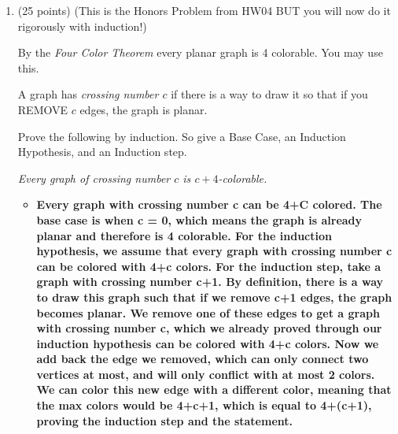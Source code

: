 \documentclass[12pt]{article}
\begin{document}
\begin{enumerate}
$(\forall n\ge 2)[a_n = a_{n-1} + 3a_{n-2}]$

Find INTEGERS $A,B$ such that

$(\forall n\ge 0)[a_n \le AB^n].$

Try to make $B$ as small as possible .

\textbf{This recurrence can be best described by an exponential function like $r^n = r^{n-1} + 3r^{n-2}$. Dividing everything by $r^{n-2}$, we get $r^2 = r + 3$. Therefore, we can find the roots of this equation to get $r = \frac {1 \pm \sqrt{13}} {2}$. The larger root of these will control how the function grows, and the larger root is approximately 2.3, so we can choose B to be the smallest integer larger than this root, which is B = 3. Plugging the b value into the base cases, we see that A is approximately 33.3, so we can choose A to be 34. Then, assuming that $a_{n-1} \le A3^{n-1}$ and $a_{n-2} \le A3^{n-2}$, we can show that $a_n = a_{n-1} + 3a_{n-2} \le A3^{n-1} + 3A3^{n-2} = A3^n$, since $A3^{n-1}$ can be written as a term of $A3^{n-2}$, that side of the equation is equal to $6A3^{n-2}$ which is equal to $2/3A3^{n}$. Since 2/3 is less than 1, the inequality holds}

\vfill

\centerline{\bf GO TO NEXT PAGE}

\newpage


\item 
(25 points) 
(This is the Honors Problem from HW04 BUT you will now do it 
rigorously with induction!)

By the {\it Four Color Theorem} every planar graph is 4 colorable.
You may use this. 

A graph has {\it crossing number $c$} if there is a way
to draw it so that if you REMOVE $c$ edges, the graph is planar.

Prove the following by induction. So give a Base Case, an Induction Hypothesis,
and an Induction step.

{\it Every graph of crossing number $c$ is $c+4$-colorable.} 

\begin{itemize}
    \item \textbf{Every graph with crossing number c can be 4+C colored. The base case is when c = 0, which means the graph is already planar and therefore is 4 colorable. For the induction hypothesis, we assume that every graph with crossing number c can be colored with 4+c colors. For the induction step, take a graph with crossing number c+1. By definition, there is a way to draw this graph such that if we remove c+1 edges, the graph becomes planar. We remove one of these edges to get a graph with crossing number c, which we already proved through our induction hypothesis can be colored with 4+c colors. Now we add back the edge we removed, which can only connect two vertices at most, and will only conflict with at most 2 colors. We can color this new edge with a different color, meaning that the max colors would be 4+c+1, which is equal to 4+(c+1), proving the induction step and the statement.}
\end{itemize}


\end{enumerate}
\end{document}

